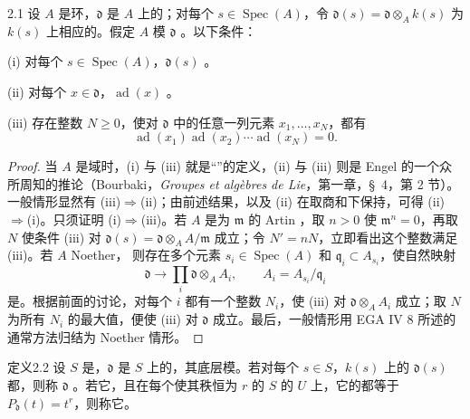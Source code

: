 \begin{SGAresult}{}{2.1}
设 $A$ 是环，$\mathfrak d$ 是 $A$ 上的；对每个 $s\in\operatorname{Spec}(A)$，令 $\mathfrak d(s)=\mathfrak d\otimes_A k(s)$ 为 $k(s)$ 上相应的。假定 $A$ 模 $\mathfrak d$ 。以下条件：

(i) 对每个 $s\in\operatorname{Spec}(A)$，$\mathfrak d(s)$ 。

(ii) 对每个 $x\in\mathfrak d$，$\operatorname{ad}(x)$ 。

(iii) 存在整数 $N\geq0$，使对 $\mathfrak d$ 中的任意一列元素 $x_1,\ldots,x_N$，都有
\[\operatorname{ad}(x_1)\operatorname{ad}(x_2)\cdots\operatorname{ad}(x_N)=0.\]
\end{SGAresult}
\begin{proof}
当 $A$ 是域时，(i) 与 (iii) 就是“”的定义，(ii) 与 (iii) 则是 Engel 的一个众所周知的推论（Bourbaki，\emph{Groupes et algèbres de Lie}，第一章，\S~4，第 2 节）。一般情形显然有 (iii)$\Rightarrow$(ii)；由前述结果，以及 (ii) 在取商和下保持，可得 (ii)$\Rightarrow$(i)。只须证明 (i)$\Rightarrow$(iii)。若 $A$ 是为 $\mathfrak m$ 的 Artin ，取 $n>0$ 使 $\mathfrak m^n=0$，再取 $N$ 使条件 (iii) 对 $\mathfrak d(s)=\mathfrak d\otimes_A A/\mathfrak m$ 成立；令 $N'=nN$，立即看出这个整数满足 (iii)。若 $A$ Noether，
则存在多个元素 $s_i\in\operatorname{Spec}(A)$ 和 $\mathfrak q_i\subset A_{s_i}$，使自然映射
\[\mathfrak d\longrightarrow\prod_i\mathfrak d\otimes_A A_i,
\qquad A_i=A_{s_i}/\mathfrak q_i\]
是。根据前面的讨论，对每个 $i$ 都有一个整数 $N_i$，使 (iii) 对 $\mathfrak d\otimes_A A_i$ 成立；取 $N$ 为所有 $N_i$ 的最大值，便使 (iii) 对 $\mathfrak d$ 成立。最后，一般情形用 EGA IV 8 所述的通常方法归结为 Noether 情形。
\end{proof}
\begin{SGAresult}{定义}{2.2}
设 $S$ 是，$\mathfrak d$ 是 $S$ 上的，其底层模。若对每个 $s\in S$，$k(s)$ 上的 $\mathfrak d(s)$ 都，则称 $\mathfrak d$ 。若它，且在每个使其秩恒为 $r$ 的 $S$ 的 $U$ 上，它的都等于 $P_{\mathfrak d}(t)=t^r$，则称它。
\end{SGAresult}

